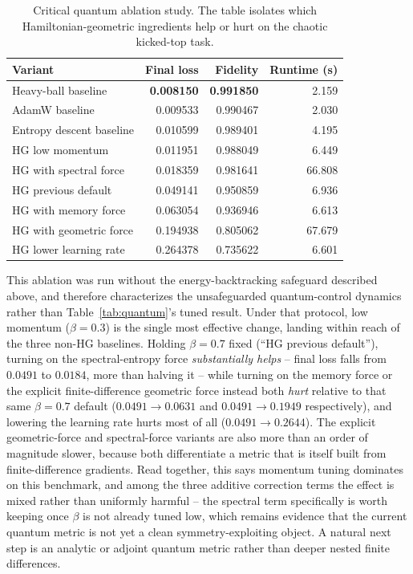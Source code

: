 \documentclass[10pt,twocolumn]{article}
\begin{document}
\begin{table}[t]
\centering
\caption{Critical quantum ablation study. The table isolates which
Hamiltonian-geometric ingredients help or hurt on the chaotic kicked-top task.}
\label{tab:quantum-ablation}
\begin{tabular}{@{}lrrr@{}}
\toprule
Variant & Final loss & Fidelity & Runtime (s) \\
\midrule
Heavy-ball baseline & \textbf{0.008150} & \textbf{0.991850} & 2.159 \\
AdamW baseline & 0.009533 & 0.990467 & 2.030 \\
Entropy descent baseline & 0.010599 & 0.989401 & 4.195 \\
HG low momentum & 0.011951 & 0.988049 & 6.449 \\
HG with spectral force & 0.018359 & 0.981641 & 66.808 \\
HG previous default & 0.049141 & 0.950859 & 6.936 \\
HG with memory force & 0.063054 & 0.936946 & 6.613 \\
HG with geometric force & 0.194938 & 0.805062 & 67.679 \\
HG lower learning rate & 0.264378 & 0.735622 & 6.601 \\
\bottomrule
\end{tabular}
\end{table}

This ablation was run without the energy-backtracking safeguard described
above, and therefore characterizes the unsafeguarded quantum-control
dynamics rather than Table~\ref{tab:quantum}'s tuned result. Under that
protocol, low momentum ($\beta=0.3$) is the single most effective change,
landing within reach of the three non-HG baselines. Holding $\beta=0.7$
fixed (``HG previous default''), turning on the spectral-entropy force
\emph{substantially helps} -- final loss falls from $0.0491$ to $0.0184$,
more than halving it -- while turning on the memory force or the explicit
finite-difference geometric force instead both \emph{hurt} relative to that
same $\beta=0.7$ default ($0.0491\to0.0631$ and $0.0491\to0.1949$
respectively), and lowering the learning rate hurts most of all
($0.0491\to0.2644$). The explicit geometric-force and spectral-force variants
are also more than an order of magnitude slower, because both differentiate
a metric that is itself built from finite-difference gradients. Read
together, this says momentum tuning dominates on this benchmark, and among
the three additive correction terms the effect is mixed rather than
uniformly harmful -- the spectral term specifically is worth keeping once
$\beta$ is not already tuned low, which remains evidence that the current
quantum metric is not yet a clean symmetry-exploiting object. A natural next
step is an analytic or adjoint quantum metric rather than deeper nested
finite differences.
\end{document}
